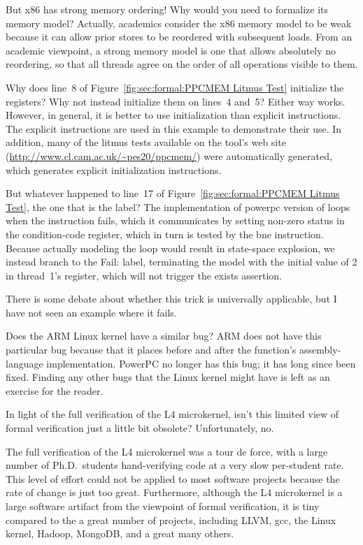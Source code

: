 \begin{enumerate}
\QuickQ{}
	But x86 has strong memory ordering!  Why would you need to
	formalize its memory model?
\QuickA{}
	Actually, academics consider the x86 memory model to be weak
	because it can allow prior stores to be reordered with
	subsequent loads.
	From an academic viewpoint, a strong memory model is one
	that allows absolutely no reordering, so that all threads
	agree on the order of all operations visible to them.

\QuickQ{}
	Why does line~8
	of Figure~\ref{fig:sec:formal:PPCMEM Litmus Test}
	initialize the registers?
	Why not instead initialize them on lines~4 and~5?
\QuickA{}
	Either way works.
	However, in general, it is better to use initialization than
	explicit instructions.
	The explicit instructions are used in this example to demonstrate
	their use.
	In addition, many of the litmus tests available on the tool's
	web site (\url{http://www.cl.cam.ac.uk/~pes20/ppcmem/}) were
	automatically generated, which generates explicit
	initialization instructions.

\QuickQ{}
	But whatever happened to line~17 of
	Figure~\ref{fig:sec:formal:PPCMEM Litmus Test},
	the one that is the  label?
\QuickA{}
	The implementation of powerpc version of 
	loops when the  instruction fails, which it communicates
	by setting non-zero status in the condition-code register,
	which in turn is tested by the bne instruction. Because actually
	modeling the loop would result in state-space explosion, we
	instead branch to the Fail: label, terminating the model with
	the initial value of 2 in thread~1's  register, which
	will not trigger the exists assertion.

	There is some debate about whether this trick is universally
	applicable, but I have not seen an example where it fails.

\QuickQ{}
	Does the ARM Linux kernel have a similar bug?
\QuickA{}
	ARM does not have this particular bug because that it places
	 before and after the 
	function's assembly-language implementation.
	PowerPC no longer has this bug; it has long since been fixed.
	Finding any other bugs that the Linux kernel might have is left
	as an exercise for the reader.

\QuickQ{}
	In light of the full verification of the L4 microkernel,
	isn't this limited view of formal verification just a little
	bit obsolete?
\QuickA{}
	Unfortunately, no.

	The full verification of the L4 microkernel was a tour de force,
	with a large number of Ph.D.~students hand-verifying code at a
	very slow per-student rate.
	This level of effort could not be applied to most software projects
	because the rate of change is just too great.
	Furthermore, although the L4 microkernel is a large software
	artifact from the viewpoint of formal verification, it is tiny
	compared to the a great number of projects, including LLVM,
	gcc, the Linux kernel, Hadoop, MongoDB, and a great many others.


\end{enumerate}

